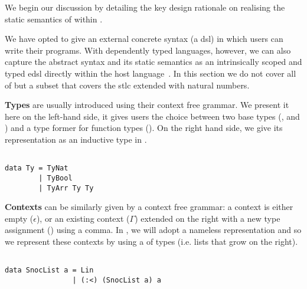 We begin our discussion by detailing the key design rationale on
realising the static semantics of \Velo{} within \Idris{}.

We have opted to give \Velo{} an external concrete syntax (a \ac{dsl})
in which users can write their programs.
%
With dependently typed languages, however, we can also capture
the abstract syntax and its static semantics as an intrinsically
scoped and typed \ac{edsl}
directly within the host language~\cite{Augustsson1999edt}.
%
In this section we do not cover all of \Velo{} but a subset that covers the \ac{stlc} extended with natural numbers.



\textbf{Types} are usually introduced using their context free grammar.
%
We present it here on the left-hand side, it gives users the choice between
two base types (\TyNat, and \TyBool) and a type former for function types
(\TyFunc{\cdot}{\cdot}).
%
On the right hand side, we give its representation as an inductive
type in \Idris{}.

\begin{center}
\begin{minipage}{0.45\textwidth}
\syntaxtypes
\end{minipage}\hfill
\begin{minipage}{0.45\textwidth}
\begin{Verbatim}

data Ty = TyNat
        | TyBool
        | TyArr Ty Ty
\end{Verbatim}
\end{minipage}
\end{center}

\textbf{Contexts} can be similarly given by a context free grammar:
a context is either empty ($\epsilon$), or an existing context ($\Gamma$)
extended on the right with a new type assignment () using a comma.
%
In \Idris{}, we will adopt a nameless representation and so we represent
these contexts by using a  of types
(i.e. lists that grow on the right).

\begin{center}
\begin{minipage}{0.35\textwidth}
\syntaxcontexts
\end{minipage}\hfill
\begin{minipage}{0.55\textwidth}
\begin{Verbatim}

data SnocList a = Lin
                | (:<) (SnocList a) a
\end{Verbatim}
\end{minipage}
\end{center}


